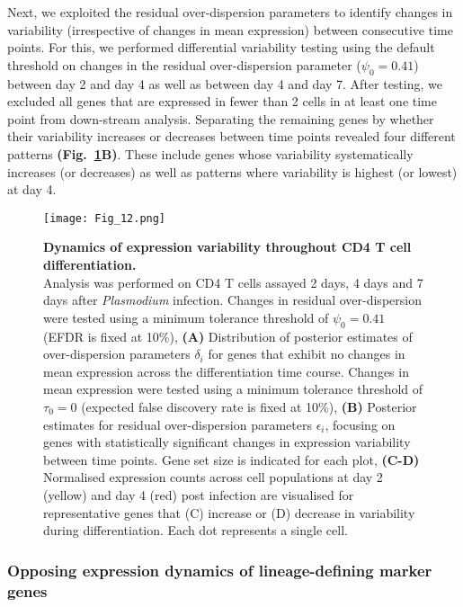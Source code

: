 Next, we exploited the residual over-dispersion parameters to identify changes in variability (irrespective of changes in mean expression) between consecutive time points. For this, we performed differential variability testing using the default threshold on changes in the residual over-dispersion parameter ($\psi_0 = 0.41$) between day 2 and day 4 as well as between day 4 and day 7. After testing, we excluded all genes that are expressed in fewer than 2 cells in at least one time point from down-stream analysis. Separating the remaining genes by whether their variability increases or decreases between time points revealed four different patterns \textbf{(Fig.~\ref{fig2:immune_differentiation}B)}. These include genes whose variability systematically increases (or decreases) as well as patterns where variability is highest (or lowest) at day 4. 

\begin{figure}[!h]
\centering
\texttt{[image: Fig\_12.png]}
\caption[Dynamics of expression variability throughout CD4\plus{} T cell differentiation]{\textbf{Dynamics of expression variability throughout CD4\plus{} T cell differentiation.}\\
Analysis was performed on CD4\plus{} T cells assayed 2 days, 4 days and 7 days after \textit{Plasmodium} infection. Changes in residual over-dispersion were tested using a minimum tolerance threshold of $\psi_0=0.41$ (EFDR is fixed at 10\%), \textbf{(A)} Distribution of posterior estimates of over-dispersion parameters $\delta_i$ for genes that exhibit no changes in mean expression across the differentiation time course. Changes in mean expression were tested using a minimum tolerance threshold of $\tau_0=0$ (expected false discovery rate is fixed at 10\%), \textbf{(B)} Posterior estimates for residual over-dispersion parameters  $\epsilon_i$, focusing on genes with statistically significant changes in expression variability between time points. Gene set size is indicated for each plot, \textbf{(C-D)} Normalised expression counts across cell populations at day 2 (yellow) and day 4 (red) post infection are visualised for representative genes that (C) increase or (D) decrease in variability during differentiation. Each dot represents a single cell.\\}
\label{fig2:immune_differentiation}
\end{figure}

\subsubsection{Opposing expression dynamics of lineage-defining marker genes}

